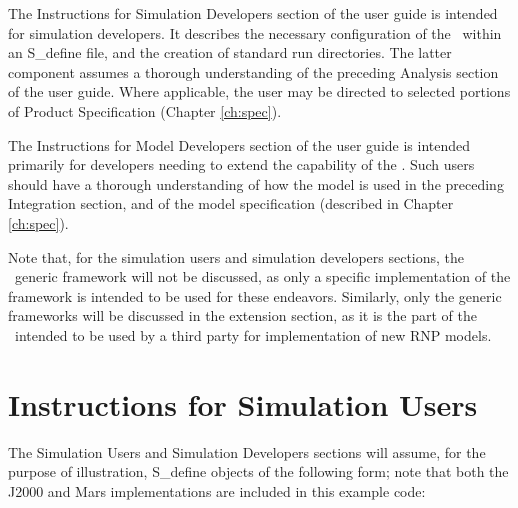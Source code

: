 The Instructions for Simulation Developers section of the user guide is intended
for simulation developers. It describes the necessary configuration of the
\ModelDesc\ within an S\_define file, and the creation of standard run
directories.  The latter component assumes a thorough understanding of the
preceding Analysis section of the user guide. Where applicable, the user may be
directed to selected portions of Product Specification (Chapter \ref{ch:spec}).

The Instructions for Model Developers section of the user guide is intended
primarily for developers needing to extend the capability of the \ModelDesc.
Such users should have a thorough understanding of how the model is used in
the preceding Integration section, and of the model specification
(described in Chapter \ref{ch:spec}).

Note that, for the simulation users and simulation developers sections, the
\ModelDesc\ generic framework will not be discussed, as only a specific
implementation of the framework is intended to be used for these endeavors.
Similarly, only the generic frameworks will be discussed in the extension
section, as it is the part of the \ModelDesc\ intended to be used by a third
party for implementation of new RNP models.

\section{Instructions for Simulation Users}

The Simulation Users and Simulation Developers sections will assume,
for the purpose of illustration, S\_define
objects of the following form; note that both the J2000 and Mars
implementations are included in this example code:

